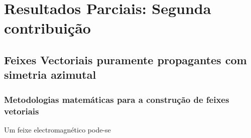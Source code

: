 \chapter{Resultados Parciais: Segunda contribui\c{c}\~ao}

\section{Feixes Vectoriais puramente propagantes com simetria azimutal}

\subsection{Metodologias matem\'aticas para a constru\c{c}\~ao de feixes vetoriais}
Um feixe electromagn\'etico pode-se